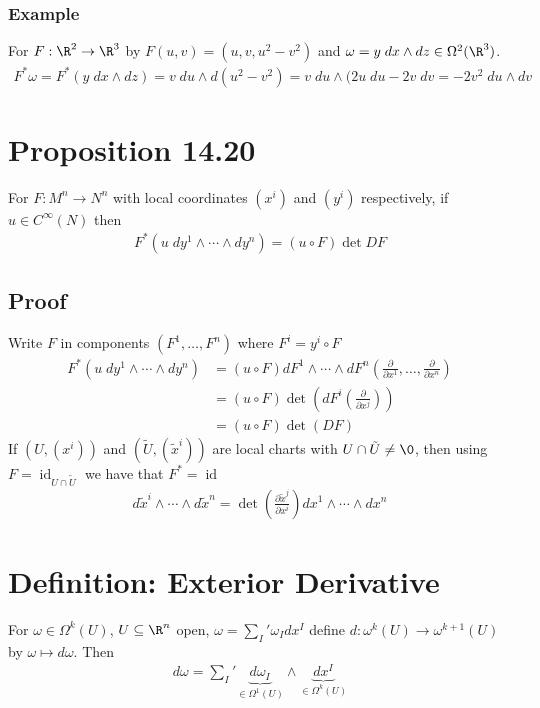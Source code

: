 \documentclass[11pt]{article}
\begin{document}
\subsubsection*{Example}
\label{sec:org4d43285}
For \(F:\R^{2}\to\R^{3}\) by \(F(u,v)=(u,v,u^{2}-v^{2})\) and \(\omega=y\;dx\wedge dz\in\Omega^{2}(\R^{3})\).\\
\begin{align*}
  F^{*}\omega
  =F^{*}(y\;dx\wedge dz)
  =v\;du\wedge d(u^{2}-v^{2})
  =v\;du\wedge(2u\;du-2v\;dv
  =-2v^{2}\;du\wedge dv
\end{align*}
\section*{Proposition 14.20}
\label{sec:orgcc47b44}
For \(F:M^{n}\to N^{n}\) with local coordinates \((x^{i})\) and \((y^{i})\) respectively, if \(u\in C^{\infty}(N)\) then\\
\begin{align*}
  F^{*}(u\;dy^{1}\wedge\cdots\wedge dy^{n})
  =(u\circ F)\det DF
\end{align*}
\subsection*{Proof}
\label{sec:org1f011a4}
Write \(F\) in components \((F^{1},\ldots, F^{n})\) where \(F^{i}=y^{i}\circ F\)\\
\begin{align*}
  F^{*}(u\;dy^{1}\wedge\cdots\wedge dy^{n})
  &=(u\circ F)dF^{1}\wedge\cdots\wedge dF^{n}\left( \frac{\partial}{\partial x^{1}},\ldots,\frac{\partial}{\partial x^{n}} \right) \\
  &=(u\circ F)\det\left( dF^{i}\left( \frac{\partial}{\partial x^{j}} \right) \right) \\
  &=(u\circ F)\det(DF)
\end{align*}
If \((U,(x^{i}))\) and \((\tilde{U},(\tilde{x}^{i}))\) are local charts with \(U\cap\tilde{U}\neq\0\), then using \(F=\operatorname{id}_{U\cap\tilde{U}}\) we have that \(F^{*}=\operatorname{id}\)\\
\begin{align*}
  d\tilde{x}^{i}\wedge\cdots\wedge d\tilde{x}^{n}
  =\det\left( \frac{\partial \tilde{x}^{j}}{\partial x^{i}} \right)dx^{1}\wedge\cdots\wedge dx^{n}
\end{align*}
\section*{Definition: Exterior Derivative}
\label{sec:org6674c4e}
For \(\omega\in\Omega^{k}(U)\), \(U\subseteq\R^{n}\) open, \(\omega=\sum_{I}'\omega_{I}dx^{I}\) define \(d:\omega^{k}(U)\to\omega^{k+1}(U)\) by \(\omega\mapsto d\omega\). Then\\
\begin{align*}
  d\omega
  =\sum_{I}'\underbrace{d\omega_{I}}_{\in\Omega^{1}(U)}\wedge\underbrace{dx^{I}}_{\in\Omega^{k}(U)}
\end{align*}
\end{document}

